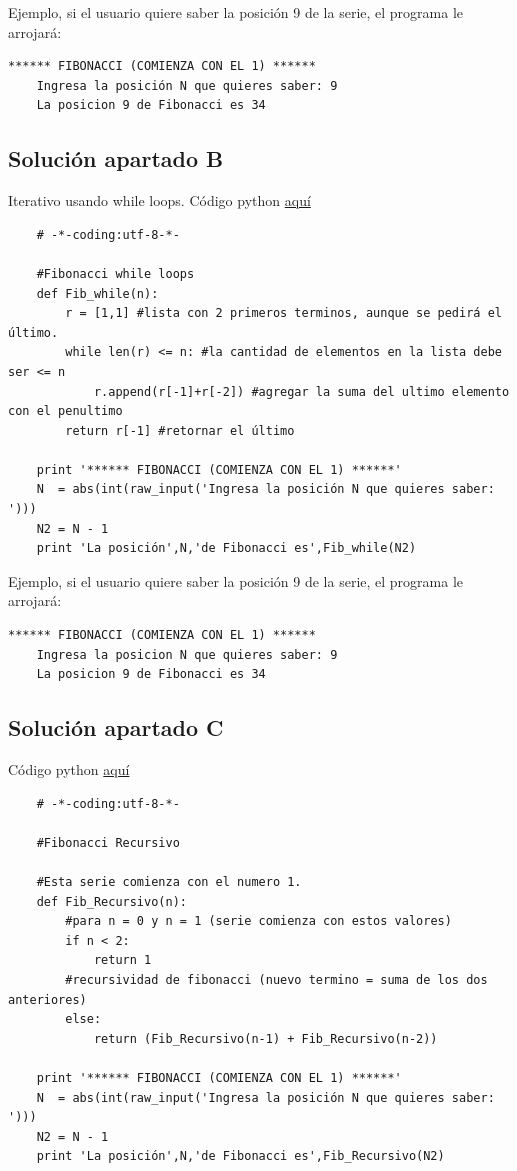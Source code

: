 \documentclass{article}
\begin{document}
    \noindent
    Ejemplo, si el usuario quiere saber la posición 9 de la serie, el programa le arrojará: 
    \begin{lstlisting}[style=C,numbers=none]
    ****** FIBONACCI (COMIENZA CON EL 1) ******
    Ingresa la posición N que quieres saber: 9
    La posicion 9 de Fibonacci es 34
    \end{lstlisting}
\subsection{Solución apartado B}
Iterativo usando while loops.
Código python \href{https://github.com/joescalona/Programacion-Astronomica/blob/master/Tarea\%205/problema3_B.py}{aquí}
    \begin{verbatim}
    # -*-coding:utf-8-*-

    #Fibonacci while loops 
    def Fib_while(n):
    	r = [1,1] #lista con 2 primeros terminos, aunque se pedirá el último. 
    	while len(r) <= n: #la cantidad de elementos en la lista debe ser <= n 
    		r.append(r[-1]+r[-2]) #agregar la suma del ultimo elemento con el penultimo
    	return r[-1] #retornar el último
    
    print '****** FIBONACCI (COMIENZA CON EL 1) ******'
    N  = abs(int(raw_input('Ingresa la posición N que quieres saber: ')))
    N2 = N - 1
    print 'La posición',N,'de Fibonacci es',Fib_while(N2)
    \end{verbatim}
    
    \noindent
    Ejemplo, si el usuario quiere saber la posición 9 de la serie, el programa le arrojará: 
    \begin{lstlisting}[style=C,numbers=none]
    ****** FIBONACCI (COMIENZA CON EL 1) ******
    Ingresa la posicion N que quieres saber: 9
    La posicion 9 de Fibonacci es 34
    \end{lstlisting}
    

\subsection{Solución apartado C}
Código python \href{https://github.com/joescalona/Programacion-Astronomica/blob/master/Tarea\%205/problema3_C.py}{aquí}
    \begin{verbatim}
    # -*-coding:utf-8-*-

    #Fibonacci Recursivo 
    
    #Esta serie comienza con el numero 1.
    def Fib_Recursivo(n):
    	#para n = 0 y n = 1 (serie comienza con estos valores)
    	if n < 2:
    		return 1
    	#recursividad de fibonacci (nuevo termino = suma de los dos anteriores)
    	else: 
    		return (Fib_Recursivo(n-1) + Fib_Recursivo(n-2))
    
    print '****** FIBONACCI (COMIENZA CON EL 1) ******'
    N  = abs(int(raw_input('Ingresa la posición N que quieres saber: ')))
    N2 = N - 1
    print 'La posición',N,'de Fibonacci es',Fib_Recursivo(N2)	
    \end{verbatim}
    
\end{document}
